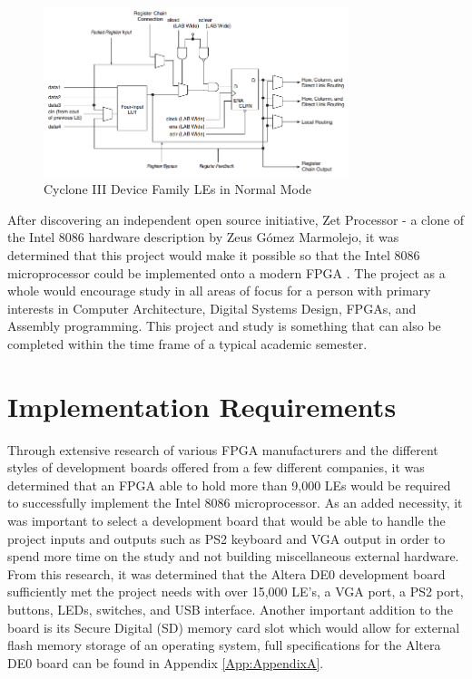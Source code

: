 \documentclass[11pt,peerreview, onecolumn]{IEEEtran}
\begin{document}
\begin{figure}[!h]
\centering
\includegraphics[width=3.5in]{LogicElement}
\caption{Cyclone III Device Family LEs in Normal Mode \cite{CycloneHandbook}}
\label{fig:LogicElement}
\end{figure}

After discovering an independent open source initiative, Zet Processor - a clone of the Intel 8086 hardware description by Zeus Gómez Marmolejo, it was determined that this project would make it possible so that the Intel 8086 microprocessor could be implemented onto a modern FPGA \cite{ZetProcessor}. The project as a whole would encourage study in all areas of focus for a person with primary interests in Computer Architecture, Digital Systems Design, FPGAs, and Assembly programming. This project and study  is something that can also be completed within the time frame of a typical academic semester.


\section{Implementation Requirements}
Through extensive research of various FPGA manufacturers and the different styles of development boards offered from a few different companies, it was determined that an FPGA able to hold more than 9,000 LEs would be required to successfully implement the Intel 8086 microprocessor. As an added necessity, it was important to select a development board that would be able to handle the project inputs and outputs such as PS2 keyboard and VGA output in order to spend more time on the study and not building miscellaneous external hardware. From this research, it was determined that the Altera DE0 development board sufficiently met the project needs with over 15,000 LE's, a VGA port, a PS2 port, buttons, LEDs, switches, and USB interface. Another important addition to the board is its Secure Digital (SD) memory card slot which would allow for external flash memory storage of an operating system, full specifications for the Altera DE0 board can be found in Appendix \ref{App:AppendixA}.
\end{document}

